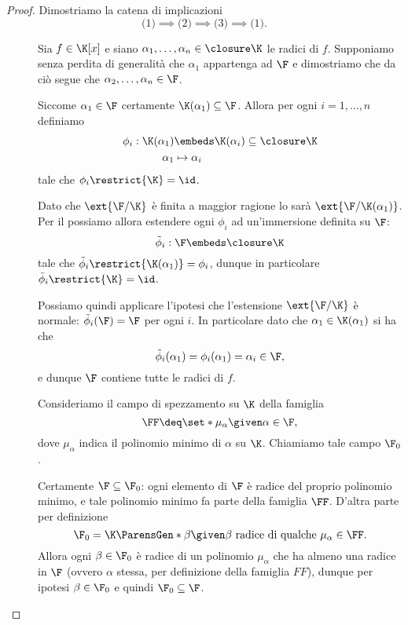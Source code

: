 \begin{proof}
    Dimostriamo la catena di implicazioni \[
        \text{(1)} \implies \text{(2)} \implies \text{(3)}\implies \text{(1)}.
    \]
    \begin{description}
        \item[]
        Sia $f \in \K[x]$ e siano $\alpha_1, \dots, \alpha_n \in \closure\K$ le radici di $f$. Supponiamo senza perdita di generalità che $\alpha_1$ appartenga ad $\F$ e dimostriamo che da ciò segue che $\alpha_2, \dots, \alpha_n \in \F$.
        
        Siccome $\alpha_1 \in \F$ certamente $\K(\alpha_1) \subseteq \F$. Allora per ogni $i = 1, \dots, n$ definiamo \begin{align*}
            \phi_i : \K(\alpha_1) &\embeds \K(\alpha_i) \subseteq \closure\K \\
            \alpha_1 &\mapsto \alpha_i
        \end{align*} tale che $\phi_i\restrict{\K} = \id$.
        
        Dato che $\ext{\F / \K}$ è finita a maggior ragione lo sarà $\ext{\F / \K(\alpha_1)}$. Per il  possiamo allora estendere ogni $\phi_i$ ad un'immersione definita su $\F$: \[
            \tilde\phi_i : \F \embeds \closure\K
        \] tale che $\tilde\phi_i\restrict{\K(\alpha_1)} = \phi_i$, dunque in particolare $\tilde\phi_i\restrict{\K} = \id$.

        Possiamo quindi applicare l'ipotesi che l'estensione $\ext{\F / \K}$ è normale: $\tilde\phi_i(\F) = \F$ per ogni $i$. In particolare dato che $\alpha_1 \in \K(\alpha_1)$ si ha che \[
            \tilde\phi_i(\alpha_1) = \phi_i(\alpha_1) = \alpha_i \in \F,
        \] e dunque $\F$ contiene tutte le radici di $f$. 
        \item[]
        Consideriamo il campo di spezzamento su $\K$ della famiglia \[
            \FF \deq \set*{\mu_\alpha \given \alpha \in \F},
        \] dove $\mu_\alpha$ indica il polinomio minimo di $\alpha$ su $\K$. Chiamiamo tale campo $\F_0$.
        
        Certamente $\F \subseteq \F_0$: ogni elemento di $\F$ è radice del proprio polinomio minimo, e tale polinomio minimo fa parte della famiglia $\FF$. D'altra parte per definizione \[
            \F_0 = \K\ParensGen*{\beta \given \beta \text{ radice di qualche } \mu_\alpha \in \FF}.
        \] Allora ogni $\beta \in \F_0$ è radice di un polinomio $\mu_\alpha$ che ha almeno una radice in $\F$ (ovvero $\alpha$ stessa, per definizione della famiglia $FF$), dunque per ipotesi $\beta \in \F_0$ e quindi $\F_0 \subseteq \F$.
        

\end{description}
\end{proof}
